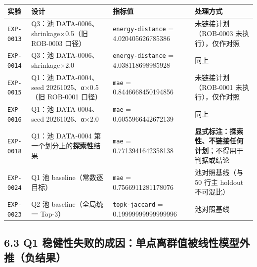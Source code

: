 \documentclass[
  11pt,
]{ctexart}
\newcounter{none} %
\begin{document}
{\def\LTcaptype{none} %
\begin{longtable}[]{@{}
  >{\raggedright\arraybackslash}p{}
  >{\raggedright\arraybackslash}p{}
  >{\raggedright\arraybackslash}p{}
  >{\raggedright\arraybackslash}p{}@{}}
\toprule\noalign{}
\begin{minipage}[b]{\linewidth}\raggedright
实验
\end{minipage} & \begin{minipage}[b]{\linewidth}\raggedright
设计
\end{minipage} & \begin{minipage}[b]{\linewidth}\raggedright
指标值
\end{minipage} & \begin{minipage}[b]{\linewidth}\raggedright
处理方式
\end{minipage} \\
\midrule\noalign{}
\endhead
\bottomrule\noalign{}
\endlastfoot
\texttt{EXP-0013} & Q3：池 DATA-0006、shrinkage×0.5（旧 ROB-0003 口径）
& \texttt{energy-distance} = 4.020405626785386 & 未链接计划（ROB-0003
未执行），仅作对照 \\
\texttt{EXP-0014} & Q3：池 DATA-0006、shrinkage×2.0 &
\texttt{energy-distance} = 4.038118698985928 & 同上 \\
\texttt{EXP-0015} & Q1：池 DATA-0004、seed 20261025、α×0.5（旧 ROB-0001
口径） & \texttt{mae} = 0.8446668450194856 & 未链接计划（ROB-0001
未执行），仅作对照 \\
\texttt{EXP-0016} & Q1：池 DATA-0004、seed 20261026、α×2.0 &
\texttt{mae} = 0.6055966442672139 & 同上 \\
\texttt{EXP-0018} & Q1：池 DATA-0004 第一个划分上的\textbf{探索性}结果 &
\texttt{mae} = 0.7713941642358138 &
\textbf{显式标注：探索性、不链接任何计划}；不得用于判据或结论 \\
\texttt{EXP-0024} & Q1 池 baseline（常数逐目标） & \texttt{mae} =
0.7566911281178076 & 池对照基线（与 50 行主 holdout 不可混比） \\
\texttt{EXP-0023} & Q2 池 baseline（全局统一 Top-3） &
\texttt{topk-jaccard} = 0.19999999999999996 & 池对照基线 \\
\end{longtable}
}

\subsection{6.3 Q1
稳健性失败的成因：单点离群值被线性模型外推（负结果）}\label{q1-ux7a33ux5065ux6027ux5931ux8d25ux7684ux6210ux56e0ux5355ux70b9ux79bbux7fa4ux503cux88abux7ebfux6027ux6a21ux578bux5916ux63a8ux8d1fux7ed3ux679c}
\end{document}

